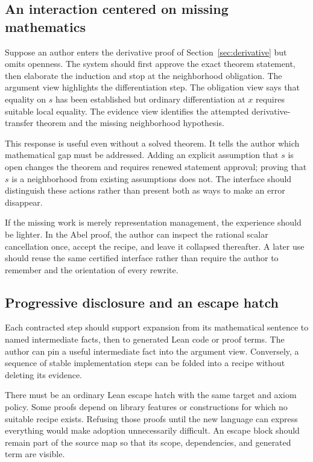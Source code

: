 \documentclass[11pt,letterpaper]{article}
\newcommand{\code}[1]{\texttt{\detokenize{#1}}}
\theoremstyle{remark}
\begin{document}
\subsection{An interaction centered on missing mathematics}

Suppose an author enters the derivative proof of Section~\ref{sec:derivative} but omits openness. The system should first approve the exact theorem statement, then elaborate the induction and stop at the neighborhood obligation. The argument view highlights the differentiation step. The obligation view says that equality on $s$ has been established but ordinary differentiation at $x$ requires suitable local equality. The evidence view identifies the attempted derivative-transfer theorem and the missing neighborhood hypothesis.

This response is useful even without a solved theorem. It tells the author which mathematical gap must be addressed. Adding an explicit assumption that $s$ is open changes the theorem and requires renewed statement approval; proving that $s$ is a neighborhood from existing assumptions does not. The interface should distinguish these actions rather than present both as ways to make an error disappear.

If the missing work is merely representation management, the experience should be lighter. In the Abel proof, the author can inspect the rational scalar cancellation once, accept the recipe, and leave it collapsed thereafter. A later use should reuse the same certified interface rather than require the author to remember \code{map_natCast} and the orientation of every rewrite.

\subsection{Progressive disclosure and an escape hatch}

Each contracted step should support expansion from its mathematical sentence to named intermediate facts, then to generated Lean code or proof terms. The author can pin a useful intermediate fact into the argument view. Conversely, a sequence of stable implementation steps can be folded into a recipe without deleting its evidence.

There must be an ordinary Lean escape hatch with the same target and axiom policy. Some proofs depend on library features or constructions for which no suitable recipe exists. Refusing those proofs until the new language can express everything would make adoption unnecessarily difficult. An escape block should remain part of the source map so that its scope, dependencies, and generated term are visible.
\end{document}
